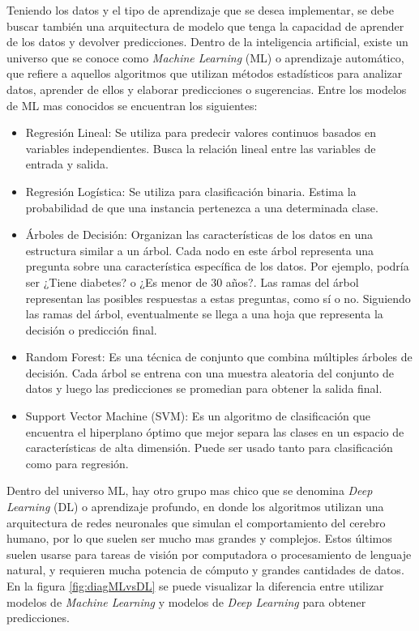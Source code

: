 Teniendo los datos y el tipo de aprendizaje que se desea implementar, se debe buscar también una arquitectura de modelo que tenga la capacidad de aprender de los datos y devolver predicciones. 
Dentro de la inteligencia artificial, existe un universo que se conoce como \textit{Machine Learning} (ML) o aprendizaje automático, que refiere a aquellos algoritmos que utilizan métodos estadísticos para analizar datos, aprender de ellos y elaborar predicciones o sugerencias. Entre los modelos de ML mas conocidos se encuentran los siguientes:

\begin{itemize}
\item Regresión Lineal: Se utiliza para predecir valores continuos basados en variables independientes. Busca la relación lineal entre las variables de entrada y salida.
\item Regresión Logística: Se utiliza para clasificación binaria. Estima la probabilidad de que una instancia pertenezca a una determinada clase.
\item Árboles de Decisión: Organizan las características de los datos en una estructura similar a un árbol. Cada nodo en este árbol representa una pregunta sobre una característica específica de los datos. Por ejemplo, podría ser ¿Tiene diabetes? o ¿Es menor de 30 años?. Las ramas del árbol representan las posibles respuestas a estas preguntas, como sí o no. Siguiendo las ramas del árbol, eventualmente se llega a una hoja que representa la decisión o predicción final.
\item Random Forest: Es una técnica de conjunto que combina múltiples árboles de decisión. Cada árbol se entrena con una muestra aleatoria del conjunto de datos y luego las predicciones se promedian para obtener la salida final.
\item Support Vector Machine (SVM): Es un algoritmo de clasificación que encuentra el hiperplano óptimo que mejor separa las clases en un espacio de características de alta dimensión. Puede ser usado tanto para clasificación como para regresión.
\end{itemize}

Dentro del universo ML, hay otro grupo mas chico que se denomina \textit{Deep Learning} (DL) o aprendizaje profundo, en donde los algoritmos utilizan una arquitectura de redes neuronales que simulan el comportamiento del cerebro humano, por lo que suelen ser mucho mas grandes y complejos.
Estos últimos suelen usarse para tareas de visión por computadora o procesamiento de lenguaje natural, y requieren mucha potencia de cómputo y grandes cantidades de datos.
En la figura \ref{fig:diagMLvsDL} se puede visualizar la diferencia entre utilizar modelos de \textit{Machine Learning} y modelos de \textit{Deep Learning} para obtener predicciones.

